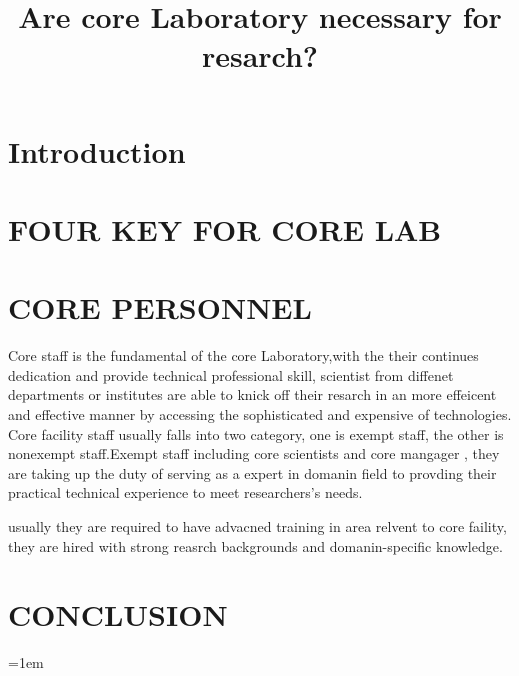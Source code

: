 \documentclass[12pt]{article}
\begin{document}
\title{\large Are core Laboratory necessary for resarch? \vspace{-2em}}
\date{\vspace{-2.5em}}
\maketitle

\section{Introduction}

 
\section{FOUR KEY FOR CORE LAB}
\section{CORE PERSONNEL}
Core staff is the fundamental of the core Laboratory,with the their continues dedication and provide technical professional skill, scientist from diffenet departments or institutes are able  to knick off  their resarch in an more effeicent and effective manner by accessing the sophisticated  and expensive of technologies. Core facility staff usually falls into two category, one is exempt staff, the other is nonexempt staff.Exempt staff including core scientists and core mangager , they are taking up the duty of serving as a expert in domanin field to provding their practical technical experience to meet researchers's  needs.

usually they are required to have advacned training in area relvent to core faility, they are hired with strong reasrch backgrounds and domanin-specific knowledge.

\section{CONCLUSION}


\medskip


\emergencystretch=1em
\printbibliography[title=Reference]
\end{document}
